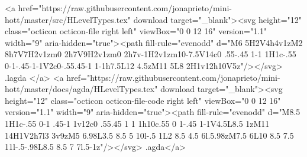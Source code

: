         <a href="https://raw.githubusercontent.com/jonaprieto/mini-hott/master/src/HLevelTypes.tex" download target="_blank"><svg height="12" class="octicon octicon-file right left" viewBox="0 0 12 16" version="1.1" width="9" aria-hidden="true"><path fill-rule="evenodd" d="M6 5H2V4h4v1zM2 8h7V7H2v1zm0 2h7V9H2v1zm0 2h7v-1H2v1zm10-7.5V14c0 .55-.45 1-1 1H1c-.55 0-1-.45-1-1V2c0-.55.45-1 1-1h7.5L12 4.5zM11 5L8 2H1v12h10V5z"/></svg> .lagda </a>
        <a href="https://raw.githubusercontent.com/jonaprieto/mini-hott/master/docs/agda/HLevelTypes.tex" download target="_blank"><svg height="12" class="octicon octicon-file-code right left" viewBox="0 0 12 16" version="1.1" width="9" aria-hidden="true"><path fill-rule="evenodd" d="M8.5 1H1c-.55 0-1 .45-1 1v12c0 .55.45 1 1 1h10c.55 0 1-.45 1-1V4.5L8.5 1zM11 14H1V2h7l3 3v9zM5 6.98L3.5 8.5 5 10l-.5 1L2 8.5 4.5 6l.5.98zM7.5 6L10 8.5 7.5 11l-.5-.98L8.5 8.5 7 7l.5-1z"/></svg> .agda</a>
      
